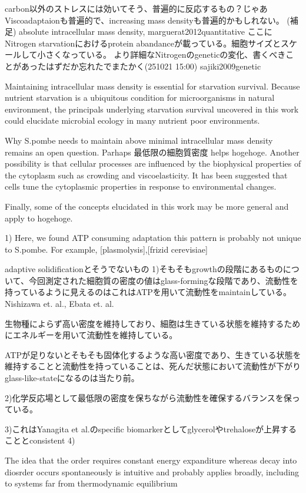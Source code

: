carbon以外のストレスには効いてそう、普遍的に反応するもの？じゃあViscoadaptaionも普遍的で、increasing mass densityも普遍的かもしれない。
(補足)
absolute intracellular mass density, marguerat2012quantitative
ここにNitrogen starvationにおけるprotein abandanceが載っている。細胞サイズとスケールして小さくなっている。
より詳細なNitrogenのgeneticの変化、書くべきことがあったはずだか忘れたでまたかく(251021 15:00)
sajiki2009genetic

Maintaining intracellular mass density is essential for starvation survival. Because nutrient starvation is a ubiquitous condition for microorganisms in natural environment, the principals underlying starvation survival uncovered in this work could elucidate microbial ecology in many nutrient poor environments. 

Why S.pombe needs to maintain above minimal intracellular mass density remains an open question. 
Parhaps 最低限の細胞質密度 helps hogehoge.
Another possibility is that cellular processes are influenced by the biophysical properties of the cytoplasm such as crowding and viscoelasticity. It has been suggested that cells tune the cytoplasmic properties in response to environmental changes.

Finally, some of the concepts elucidated in this work may be more general and apply to hogehoge.

1) Here, we found ATP consuming adaptation
this pattern is probably not unique to S.pombe. For example, [plasmolysis],[frizid cerevisiae]

adaptive solidificationとそうでないもの
1)そもそもgrowthの段階にあるものについて、今回測定された細胞質の密度の値はglass-formingな段階であり、流動性を持っているように見えるのはこれはATPを用いて流動性をmaintainしている。Nishizawa et. al., Ebata et. al.

生物種によらず高い密度を維持しており、細胞は生きている状態を維持するためにエネルギーを用いて流動性を維持している。

ATPが足りないとそもそも固体化するような高い密度であり、生きている状態を維持することと流動性を持っていることは、死んだ状態において流動性が下がりglass-like-stateになるのは当たり前。

2)化学反応場として最低限の密度を保ちながら流動性を確保するバランスを保っている。

3)これはYanagita et al.のspecific biomarkerとしてglycerolやtrehaloseが上昇することとconsistent
4)

 The idea that the order requires constant energy expanditure whereas decay into diosrder occurs spontaneously is intuitive and probably applies broadly, including to systems far from thermodynamic equilibrium

